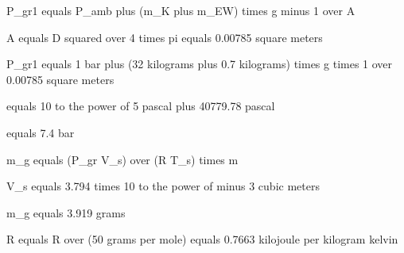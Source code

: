 P_gr1 equals P_amb plus (m_K plus m_EW) times g minus 1 over A

A equals D squared over 4 times pi equals 0.00785 square meters

P_gr1 equals 1 bar plus (32 kilograms plus 0.7 kilograms) times g times 1 over 0.00785 square meters

equals 10 to the power of 5 pascal plus 40779.78 pascal

equals 7.4 bar

m_g equals (P_gr V_s) over (R T_s) times m

V_s equals 3.794 times 10 to the power of minus 3 cubic meters

m_g equals 3.919 grams

R equals R over (50 grams per mole) equals 0.7663 kilojoule per kilogram kelvin